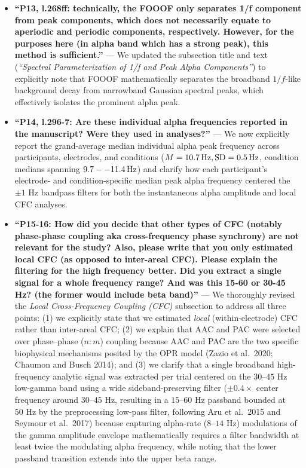 \documentclass[11pt]{article}
\begin{document}
\begin{itemize}[leftmargin=1.5em]
    \item \textbf{``P13, l.268ff: technically, the FOOOF only separates 1/f component from peak components, which does not necessarily equate to aperiodic and periodic components, respectively. However, for the purposes here (in alpha band which has a strong peak), this method is sufficient.''} --- \textcolor{revblue}{We updated the subsection title and text (\textit{``Spectral Parameterization of 1/f and Peak Alpha Components''}) to explicitly note that FOOOF mathematically separates the broadband $1/f$-like background decay from narrowband Gaussian spectral peaks, which effectively isolates the prominent alpha peak.}
    \item \textbf{``P14, l.296-7: Are these individual alpha frequencies reported in the manuscript? Were they used in analyses?''} --- \textcolor{revblue}{We now explicitly report the grand-average median individual alpha peak frequency across participants, electrodes, and conditions ($M = 10.7\,\text{Hz}{}, \text{SD} = 0.5\,\text{Hz}{}$, condition medians spanning $9.7--11.4\,\text{Hz}{}$) and clarify how each participant's electrode- and condition-specific median peak alpha frequency centered the $\pm 1\text{ Hz}$ bandpass filters for both the instantaneous alpha amplitude and local CFC analyses.}
    \item \textbf{``P15-16: How did you decide that other types of CFC (notably phase-phase coupling aka cross-frequency phase synchrony) are not relevant for the study? Also, please write that you only estimated local CFC (as opposed to inter-areal CFC). Please explain the filtering for the high frequency better. Did you extract a single signal for a whole frequency range? And was this 15-60 or 30-45 Hz? (the former would include beta band)''} --- \textcolor{revblue}{We thoroughly revised the \textit{Local Cross-Frequency Coupling (CFC)} subsection to address all three points: (1) we explicitly state that we estimated \textit{local} (within-electrode) CFC rather than inter-areal CFC; (2) we explain that AAC and PAC were selected over phase--phase ($n:m$) coupling because AAC and PAC are the two specific biophysical mechanisms posited by the OPR model (Zazio et al.\ 2020; Chaumon and Busch 2014); and (3) we clarify that a single broadband high-frequency analytic signal was extracted per trial centered on the $30\text{--}45\text{ Hz}$ low-gamma band using a wide sideband-preserving filter ($\pm 0.4 \times$ center frequency around $30\text{--}45\text{ Hz}$, resulting in a $15\text{--}60\text{ Hz}$ passband bounded at $50\text{ Hz}$ by the preprocessing low-pass filter, following Aru et al.\ 2015 and Seymour et al.\ 2017) because capturing alpha-rate ($8\text{--}14\text{ Hz}$) modulations of the gamma amplitude envelope mathematically requires a filter bandwidth at least twice the modulating alpha frequency, while noting that the lower passband transition extends into the upper beta range.}
\end{itemize}
\end{document}

